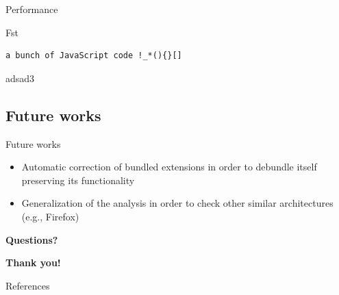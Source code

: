 \documentclass[11pt]{beamer}
\begin{document}
\begin{frame}{Performance}

\end{frame}


\begin{frame}[fragile]{Fst}
\begin{lstlisting}
a bunch of JavaScript code !_*(){}[]
\end{lstlisting}
adsad3
\end{frame}

\subsection{Future works}
\begin{frame}{Future works}
\begin{itemize}
\item Automatic correction of bundled extensions in order to debundle itself preserving its functionality
\item Generalization of the analysis in order to check other similar architectures (e.g., Firefox)
\end{itemize}
\end{frame}

\begin{frame}
\begin{center}
{\Large \textbf{Questions?}}
\end{center}
\end{frame}

\begin{frame}
\begin{center}
{\Large \textbf{Thank you!}}
\end{center}
\end{frame}

\begin{frame}{References}
\begin{tiny}


\end{tiny}
\end{frame}
\end{document}
